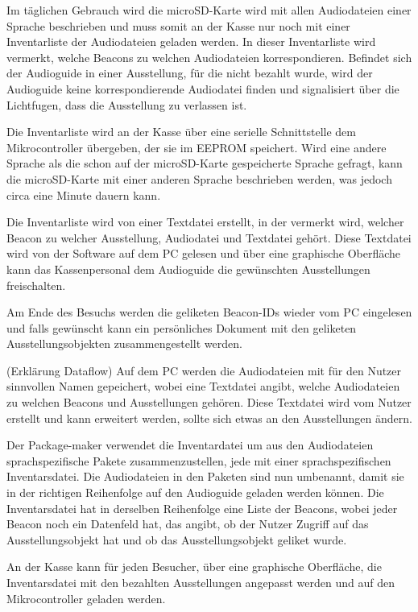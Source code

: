 Im täglichen Gebrauch wird die microSD-Karte wird mit allen Audiodateien einer Sprache beschrieben und muss somit an der Kasse nur noch mit einer Inventarliste der Audiodateien geladen werden.
In dieser Inventarliste wird vermerkt, welche Beacons zu welchen Audiodateien korrespondieren.
Befindet sich der Audioguide in einer Ausstellung, für die nicht bezahlt wurde, wird der Audioguide keine korrespondierende Audiodatei finden und signalisiert über die Lichtfugen, dass die Ausstellung zu verlassen ist.

Die Inventarliste wird an der Kasse über eine serielle Schnittstelle dem Mikrocontroller übergeben, der sie im EEPROM speichert.
Wird eine andere Sprache als die schon auf der microSD-Karte gespeicherte Sprache gefragt, kann die microSD-Karte mit einer anderen Sprache beschrieben werden, was jedoch circa eine Minute dauern kann.

Die Inventarliste wird von einer Textdatei erstellt, in der vermerkt wird, welcher Beacon zu welcher Ausstellung, Audiodatei und Textdatei gehört.
Diese Textdatei wird von der Software auf dem PC gelesen und über eine graphische Oberfläche kann das Kassenpersonal dem Audioguide die gewünschten Ausstellungen freischalten.

Am Ende des Besuchs werden die geliketen Beacon-IDs wieder vom PC eingelesen und falls gewünscht kann ein persönliches Dokument mit den geliketen Ausstellungsobjekten zusammengestellt werden.


(Erklärung Dataflow)
Auf dem PC werden die Audiodateien mit für den Nutzer sinnvollen Namen gepeichert, wobei eine Textdatei angibt, welche Audiodateien zu welchen Beacons und Ausstellungen gehören.
Diese Textdatei wird vom Nutzer erstellt und kann erweitert werden, sollte sich etwas an den Ausstellungen ändern.

Der Package-maker verwendet die Inventardatei um aus den Audiodateien sprachspezifische Pakete zusammenzustellen, jede mit einer sprachspezifischen Inventarsdatei.
Die Audiodateien in den Paketen sind nun umbenannt, damit sie in der richtigen Reihenfolge auf den Audioguide geladen werden können.
Die Inventarsdatei hat in derselben Reihenfolge eine Liste der Beacons, wobei jeder Beacon noch ein Datenfeld hat, das angibt, ob der Nutzer Zugriff auf das Ausstellungsobjekt hat und ob das Ausstellungsobjekt geliket wurde.

An der Kasse kann für jeden Besucher, über eine graphische Oberfläche, die Inventarsdatei mit den bezahlten Ausstellungen angepasst werden und auf den Mikrocontroller geladen werden.
